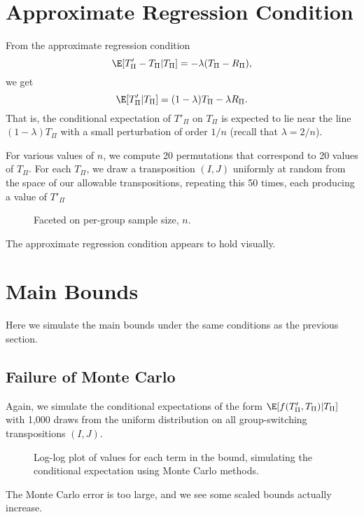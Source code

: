 \section{Approximate Regression Condition}
From the approximate regression condition
\begin{equation*}
  \E [T'_{\Pi} - T_{\Pi} | T_{\Pi}] = -\lambda (T_{\Pi} - R_{\Pi}),
\end{equation*}
we get
\begin{equation*}
  \E [T'_{\Pi}| T_{\Pi}] = (1-\lambda) T_{\Pi} - \lambda R_{\Pi}.
\end{equation*}
That is, the conditional expectation of $T'_{\Pi}$ on $T_{\Pi}$ is expected to lie near the line
$(1-\lambda) T_{\Pi}$ with a small perturbation of order $1 / n$ (recall that $\lambda = 2 / n$).

For various values of $n$, we compute 20 permutations that correspond to 20 values of $T_{\Pi}$.
For each $T_{\Pi}$, we draw a transposition $(I, J)$ uniformly at random from the space of our
allowable transpositions, repeating this 50 times, each producing a value of $T'_{\Pi}$
\begin{figure}[!ht]
  \centering
  \resizebox{12.0cm}{!}{}
  \caption{Faceted on per-group sample size, $n$.}
\end{figure}

The approximate regression condition appears to hold visually.
\clearpage

\section{Main Bounds}
Here we simulate the main bounds under the same conditions as the previous section.
\subsection{Failure of Monte Carlo}
Again, we simulate the conditional expectations of the form $\E[f(T'_{\Pi}, T_{\Pi}) | T_{\Pi}]$
with 1,000 draws from the uniform distribution on all group-switching transpositions $(I, J)$.

\begin{figure}[!ht]
  \centering
  
  \caption{Log-log plot of values for each term in the bound,
    simulating the conditional expectation using Monte Carlo methods.}
\end{figure}
The Monte Carlo error is too large, and we see some scaled bounds actually increase.
\clearpage


